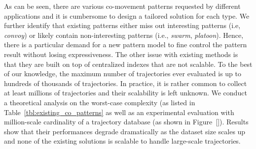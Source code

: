 As can be seen, there are various co-movement patterns requested by different applications and it is cumbersome to design a tailored solution for each type. 
We further identify that existing patterns either miss out interesting patterns (i.e, \emph{convoy}) 
or likely contain non-interesting patterns (i.e., \emph{swarm}, \emph{platoon}).
Hence, there is a particular demand for a new pattern model to fine control the pattern result without losing expressiveness. 
The other issue with existing methods is that they are built on top of centralized indexes that are not scalable. To the best of our knowledge, the maximum number of trajectories ever evaluated is up to hundreds of thousands of trajectories. In practice, it is rather common to collect at least millions of trajectories and their scalability is left unknown. We conduct a theoretical analysis on the worst-case complexity (as listed in Table~\ref{tbl:existing_co_patterns} as well as an experimental evaluation with million-scale cardinality of a trajectory database (as shown in Figure~\ref{}). Results show that their performances degrade dramatically as the dataset size scales up and none of the existing solutions is scalable to handle large-scale trajectories.

